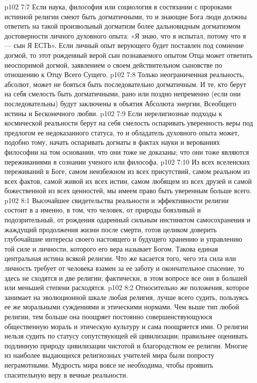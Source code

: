 \vs p102 7:7 \pc Если наука, философия или социология в состязании с пророками истинной религии смеют быть догматичными, то и знающие Бога люди должны ответить на такой произвольный догматизм более дальновидным догматизмом достоверности личного духовного опыта: «Я знаю, что я испытал, потому что я --- сын Я ЕСТЬ». Если личный опыт верующего будет поставлен под сомнение догмой, то этот рожденный верой сын познаваемого опытом Отца может ответить неоспоримой догмой, заявлением о своем действительном сыновстве по отношению к Отцу Всего Сущего.
\vs p102 7:8 Только неограниченная реальность, абсолют, может не бояться быть последовательно догматичным. И те, кто берут на себя смелость быть догматичными, рано или поздно непременно (если они последовательны) будут заключены в объятия Абсолюта энергии, Всеобщего истины и Бесконечного любви.
\vs p102 7:9 Если нерелигиозные подходы к космической реальности берут на себя смелость оспаривать уверенность веры под предлогом ее недоказанного статуса, то и обладатель духовного опыта может, подобно тому, начать оспаривать догматы в фактах науки и верованиях философии на том основании, что они тоже не доказаны; что они тоже являются переживаниями в сознании ученого или философа.
\vs p102 7:10 \pc Из всех вселенских переживаний в Боге, самом неизбежном из всех присутствий, самом реальном из всех фактов, самой живой их всех истин, самом любящем из всех друзей и самой божественной из всех ценностей, мы имеем право быть уверенным больше всего.
\vs p102 8:1 Высочайшее свидетельства реальности и эффективности религии состоит в  а именно, в том, что человек, от природы боязливый и подозрительный, от рождения одаренный сильным инстинктом самосохранения и жаждущий продолжения жизни после смерти, готов целиком доверить глубочайшие интересы своего настоящего и будущего хранению и управлению той силе и личности, которого его вера называет Богом. Такова единая центральная истина всякой религии. Что же касается того, чего эта сила или личность требует от человека взамен за ее заботу и окончательное спасение, то здесь не сходятся и две религии; фактически, в этом вопросе все они в большей или меньшей степени расходятся.
\vs p102 8:2 Относительно же положения, которое занимает на эволюционной шкале любая религия, лучше всего судить, пользуясь ее же моральными суждениями и этическими нормами. Чем выше тип любой религии, тем больше она поощряет постоянно совершенствующуюся общественную мораль и этическую культуру и сама поощряется ими. О религии нельзя судить по статусу сопутствующей ей цивилизации; правильнее оценивать подлинную природу цивилизации чистотой и благородством ее религии. Многие из наиболее выдающихся религиозных учителей мира были попросту неграмотными. Мудрость мира вовсе не необходима, чтобы проявить спасительную веру в вечные реальности.
